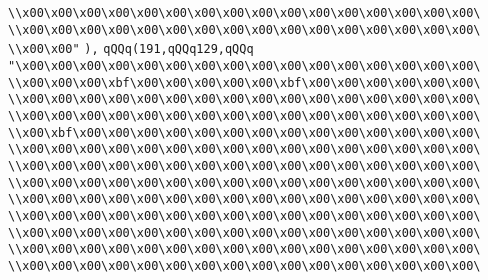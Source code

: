 \verb|\\x00\x00\x00\x00\x00\x00\x00\x00\x00\x00\x00\x00\x00\x00\x00\x00\|\newline
\verb|\\x00\x00\x00\x00\x00\x00\x00\x00\x00\x00\x00\x00\x00\x00\x00\x00\|\newline
\verb|\\x00\x00"|\newline
\verb|),|\newline
\verb|qQQq(191,qQQq129,qQQq|\newline
\verb|"\x00\x00\x00\x00\x00\x00\x00\x00\x00\x00\x00\x00\x00\x00\x00\x00\|\newline
\verb|\\x00\x00\x00\xbf\x00\x00\x00\x00\x00\xbf\x00\x00\x00\x00\x00\x00\|\newline
\verb|\\x00\x00\x00\x00\x00\x00\x00\x00\x00\x00\x00\x00\x00\x00\x00\x00\|\newline
\verb|\\x00\x00\x00\x00\x00\x00\x00\x00\x00\x00\x00\x00\x00\x00\x00\x00\|\newline
\verb|\\x00\xbf\x00\x00\x00\x00\x00\x00\x00\x00\x00\x00\x00\x00\x00\x00\|\newline
\verb|\\x00\x00\x00\x00\x00\x00\x00\x00\x00\x00\x00\x00\x00\x00\x00\x00\|\newline
\verb|\\x00\x00\x00\x00\x00\x00\x00\x00\x00\x00\x00\x00\x00\x00\x00\x00\|\newline
\verb|\\x00\x00\x00\x00\x00\x00\x00\x00\x00\x00\x00\x00\x00\x00\x00\x00\|\newline
\verb|\\x00\x00\x00\x00\x00\x00\x00\x00\x00\x00\x00\x00\x00\x00\x00\x00\|\newline
\verb|\\x00\x00\x00\x00\x00\x00\x00\x00\x00\x00\x00\x00\x00\x00\x00\x00\|\newline
\verb|\\x00\x00\x00\x00\x00\x00\x00\x00\x00\x00\x00\x00\x00\x00\x00\x00\|\newline
\verb|\\x00\x00\x00\x00\x00\x00\x00\x00\x00\x00\x00\x00\x00\x00\x00\x00\|\newline
\verb|\\x00\x00\x00\x00\x00\x00\x00\x00\x00\x00\x00\x00\x00\x00\x00\x00\|\newline
